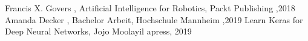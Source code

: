 \documentclass[conference]{IEEEtran}
\begin{document}

\begin{thebibliography}{00}
	Francis X. Govers , Artificial Intelligence for Robotics, Packt Publishing ,2018
	Amanda Decker , Bachelor Arbeit, Hochschule Mannheim ,2019
	Learn Keras for Deep Neural Networks, Jojo Moolayil apress, 2019
\end{thebibliography}
\end{document}

